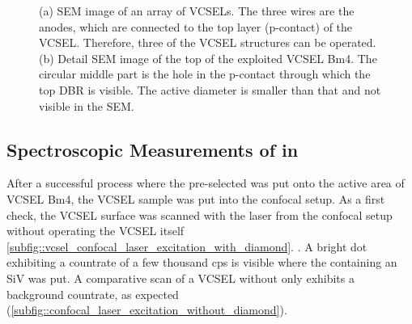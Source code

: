 \begin{figure}[tp]
\begin{subfigure}[t]{ 0.49\linewidth}
			\caption{}
			\label{subfig::vcsel_sem_detail}
		\end{subfigure}
		\caption{(a) SEM image of an array of VCSELs. The three wires are the anodes, which are connected to the top layer (p-contact) of the VCSEL. Therefore, three of the VCSEL structures can be operated. (b) Detail SEM image of the top of the exploited VCSEL Bm4. The circular middle part is the hole in the p-contact through which the top DBR is visible. The active diameter is smaller than that and not visible in the SEM.}
	\end{figure}

	\subsection{Spectroscopic Measurements of \Nd in \Vcsel}

	After a successful \pp process where the pre-selected \nd was put onto the active area of VCSEL Bm4, the VCSEL sample was put into the confocal setup.
	As a first check, the VCSEL surface was scanned with the laser from the confocal setup without operating the VCSEL itself \cref{subfig::vcsel_confocal_laser_excitation_with_diamond}.
	.
	A bright dot exhibiting a countrate of a few thousand cps is visible where the \nd containing an SiV was put.
	A comparative scan of a VCSEL without \nd only exhibits a background countrate, as expected (\cref{subfig::confocal_laser_excitation_without_diamond}).



